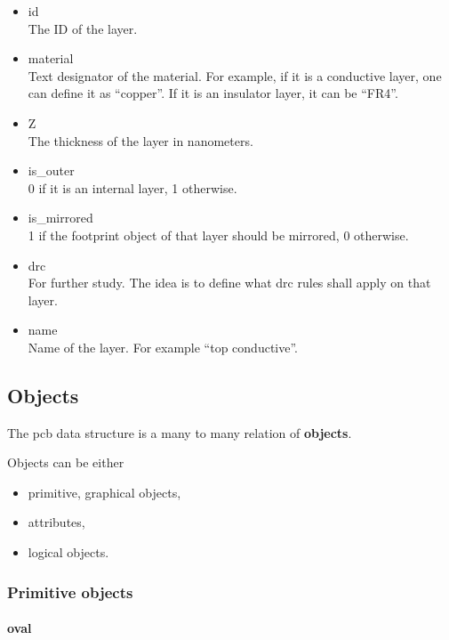 \documentclass[12pt]{article}
\begin{document}
\begin{itemize}
\item
  id\\ The ID of the layer.
\item
  material\\ Text designator of the material. For example, if it is a
  conductive layer, one can define it as ``copper''. If it is an
  insulator layer, it can be ``FR4''.
\item
  Z\\ The thickness of the layer in nanometers.
\item
  is\_outer\\ 0 if it is an internal layer, 1 otherwise.
\item
  is\_mirrored\\ 1 if the footprint object of that layer should be
  mirrored, 0 otherwise.
\item
  drc\\ For further study. The idea is to define what drc rules shall
  apply on that layer.
\item
  name\\ Name of the layer. For example ``top conductive''.
\end{itemize}

\subsection{Objects}\label{objects}

The pcb data structure is a many to many relation of \textbf{objects}.

Objects can be either

\begin{itemize}
\item
  primitive, graphical objects,
\item
  attributes,
\item
  logical objects.
\end{itemize}

\subsubsection{Primitive objects}\label{primitive-objects}

\paragraph{oval}\label{oval}

\mbox{}\\
\end{document}
